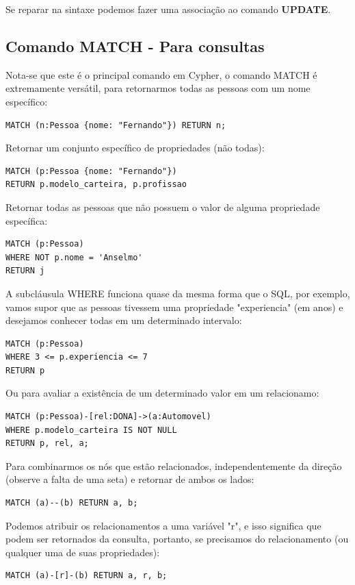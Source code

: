 Se reparar na sintaxe podemos fazer uma associação ao comando \textbf{UPDATE}.

\subsection{Comando MATCH - Para consultas}
Nota-se que este é o principal comando em Cypher, o comando MATCH é extremamente versátil, para retornarmos todas as pessoas com um nome específico:
\begin{lstlisting}[]
MATCH (n:Pessoa {nome: "Fernando"}) RETURN n;
\end{lstlisting}

Retornar um conjunto específico de propriedades (não todas):
\begin{lstlisting}[]
MATCH (p:Pessoa {nome: "Fernando"})
RETURN p.modelo_carteira, p.profissao
\end{lstlisting}

Retornar todas as pessoas que não possuem o valor de alguma propriedade específica:
\begin{lstlisting}[]
MATCH (p:Pessoa) 
WHERE NOT p.nome = 'Anselmo'
RETURN j
\end{lstlisting}

A subcláusula WHERE funciona quase da mesma forma que o SQL, por exemplo, vamos supor que as pessoas tivessem uma propriedade "experiencia" (em anos) e desejamos conhecer todas em um determinado intervalo:
\begin{lstlisting}[]
MATCH (p:Pessoa)
WHERE 3 <= p.experiencia <= 7
RETURN p
\end{lstlisting}

Ou para avaliar a existência de um determinado valor em um relacionamo:
\begin{lstlisting}[]
MATCH (p:Pessoa)-[rel:DONA]->(a:Automovel)
WHERE p.modelo_carteira IS NOT NULL
RETURN p, rel, a;
\end{lstlisting}

Para combinarmos os nós que estão relacionados, independentemente da direção (observe a falta de uma seta) e retornar de ambos os lados:
\begin{lstlisting}[]
MATCH (a)--(b) RETURN a, b;
\end{lstlisting}

Podemos atribuir os relacionamentos a uma variável "r", e isso significa que podem ser retornados da consulta, portanto, se precisamos do relacionamento (ou qualquer uma de suas propriedades):
\begin{lstlisting}[]
MATCH (a)-[r]-(b) RETURN a, r, b;
\end{lstlisting}

